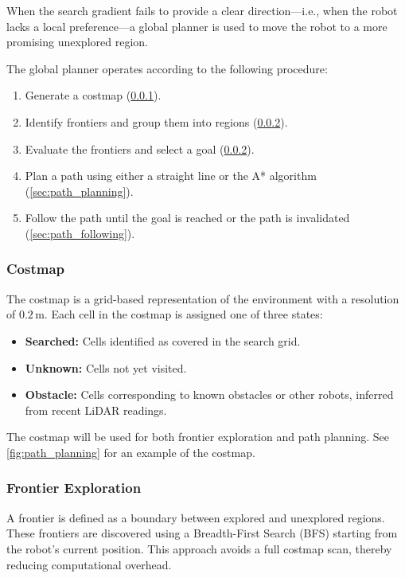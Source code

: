 When the search gradient fails to provide a clear direction—i.e., when the robot lacks a local preference—a global planner is used to move the robot to a more promising unexplored region.

The global planner operates according to the following procedure:

\begin{enumerate}
  \item Generate a costmap (\cref{sec:costmap}).
  \item Identify frontiers and group them into regions (\cref{sec:frontier_exploration}).
  \item Evaluate the frontiers and select a goal (\cref{sec:frontier_exploration}).
  \item Plan a path using either a straight line or the A* algorithm (\cref{sec:path_planning}).
  \item Follow the path until the goal is reached or the path is invalidated (\cref{sec:path_following}).
\end{enumerate}

\subsubsection{Costmap}
\label{sec:costmap}
The costmap is a grid-based representation of the environment with a resolution of $0.2\,\text{m}$. Each cell in the costmap is assigned one of three states:

\begin{itemize}
  \item \textbf{Searched:} Cells identified as covered in the search grid.
  \item \textbf{Unknown:} Cells not yet visited.
  \item \textbf{Obstacle:} Cells corresponding to known obstacles or other robots, inferred from recent LiDAR readings.
\end{itemize}

The costmap will be used for both frontier exploration and path planning. See \cref{fig:path_planning} for an example of the costmap.

\subsubsection{Frontier Exploration}
\label{sec:frontier_exploration}
A frontier is defined as a boundary between explored and unexplored regions. These frontiers are discovered using a Breadth-First Search (BFS) starting from the robot's current position. This approach avoids a full costmap scan, thereby reducing computational overhead. \\

